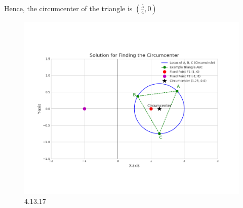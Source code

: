 \documentclass[journal]{IEEEtran}
\begin{document}
Hence, the circumcenter of the triangle is $\left(\frac{5}{4}, 0\right)$
\begin{figure}[H]
    \centering
    \includegraphics[width=0.85\columnwidth]{figs/graph9.png}
    \caption{4.13.17}
    \label{fig:placeholder}
\end{figure}
\end{document}
